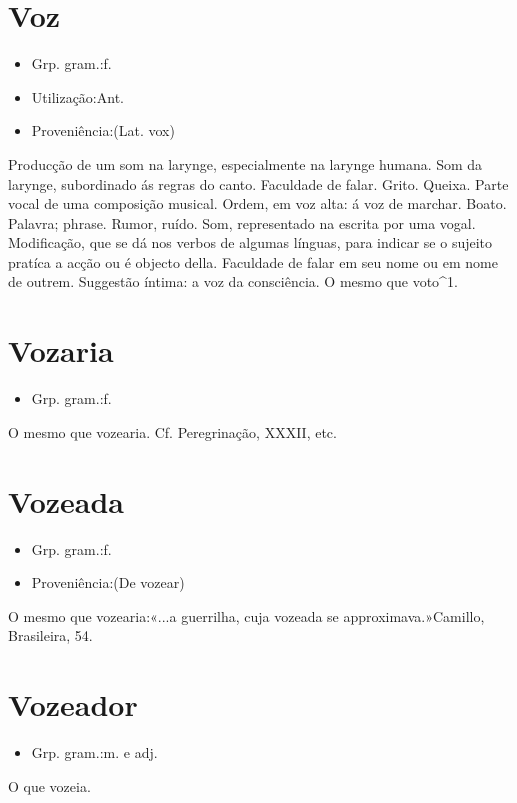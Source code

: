 \documentclass{article}
\begin{document}
\section{Voz}
\begin{itemize}
\item {Grp. gram.:f.}
\end{itemize}
\begin{itemize}
\item {Utilização:Ant.}
\end{itemize}
\begin{itemize}
\item {Proveniência:(Lat. \textunderscore vox\textunderscore )}
\end{itemize}
Producção de um som na larynge, especialmente na larynge humana.
Som da larynge, subordinado ás regras do canto.
Faculdade de falar.
Grito.
Queixa.
Parte vocal de uma composição musical.
Ordem, em voz alta: \textunderscore á voz de marchar\textunderscore .
Boato.
Palavra; phrase.
Rumor, ruído.
Som, representado na escrita por uma vogal.
Modificação, que se dá nos verbos de algumas línguas, para indicar se o sujeito pratíca a acção ou é objecto della.
Faculdade de falar em seu nome ou em nome de outrem.
Suggestão íntima: \textunderscore a voz da consciência\textunderscore .
O mesmo que \textunderscore voto\textunderscore ^1.
\section{Vozaria}
\begin{itemize}
\item {Grp. gram.:f.}
\end{itemize}
O mesmo que \textunderscore vozearia\textunderscore . Cf. \textunderscore Peregrinação\textunderscore , XXXII, etc.
\section{Vozeada}
\begin{itemize}
\item {Grp. gram.:f.}
\end{itemize}
\begin{itemize}
\item {Proveniência:(De \textunderscore vozear\textunderscore )}
\end{itemize}
O mesmo que \textunderscore vozearia\textunderscore :«\textunderscore ...a guerrilha, cuja vozeada se approximava.\textunderscore »Camillo, \textunderscore Brasileira\textunderscore , 54.
\section{Vozeador}
\begin{itemize}
\item {Grp. gram.:m.  e  adj.}
\end{itemize}
O que vozeia.
\end{document}
